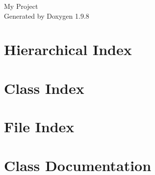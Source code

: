 \documentclass[twoside]{book}
\newcommand{\+}{\discretionary{\mbox{\scriptsize$\hookleftarrow$}}{}{}}
\newcommand{\clearemptydoublepage}{%
    \newpage{\pagestyle{empty}\cleardoublepage}%
  }
\begin{document}
  \raggedbottom
    \hypersetup{pageanchor=false,
                bookmarksnumbered=true,
                pdfencoding=unicode
               }
  \begin{titlepage}
  \vspace*{7cm}
  \begin{center}%
  {\Large My Project}\\
  \vspace*{1cm}
  {\large Generated by Doxygen 1.9.8}\\
  \end{center}
  \end{titlepage}
  \clearemptydoublepage
  \tableofcontents
  \clearemptydoublepage
  \hypersetup{pageanchor=true}

\chapter{Hierarchical Index}

\chapter{Class Index}

\chapter{File Index}

\chapter{Class Documentation}

































\end{document}
